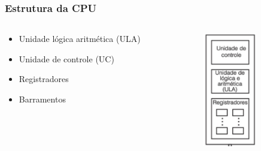 \documentclass[aspectratio=169,
				xcolor=table]{beamer}
\begin{document}
	\begin{frame}
		\frametitle{Estrutura da CPU}
		\begin{columns}
			\begin{column}{0.55\textwidth}
				\begin{itemize}
					\item Unidade lógica aritmética (ULA)
					\vspace{1em}
					\item Unidade de controle (UC)
					\vspace{1em}
					\item Registradores
					\vspace{1em}
					\item Barramentos

				\end{itemize}
			\end{column}
			\begin{column}{0.3\textwidth}
				\vspace{-0.5cm}
				\begin{figure}
					\includegraphics[height=5cm, keepaspectratio]{../figs/cap05/composicao.png} 
				\end{figure}				
			\end{column}
		\end{columns}
	\end{frame}
	
\end{document}
